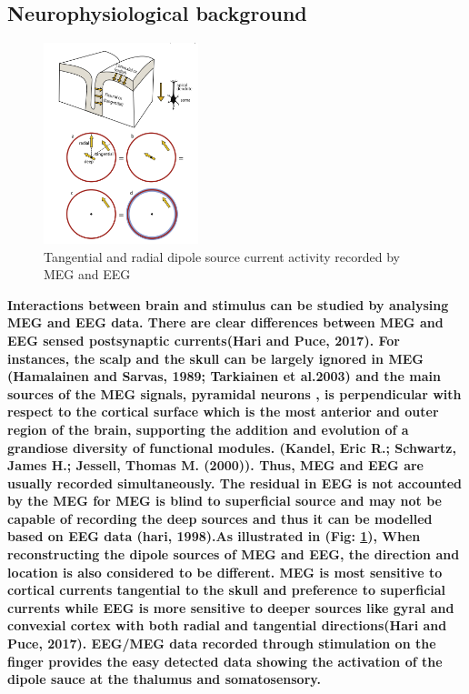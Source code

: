 \documentclass[5p]{elsarticle}
\begin{document}
\begin{frontmatter}
\subsection{Neurophysiological background} 
    \begin{figure}[h!]
        \begin{center}            \includegraphics[width=0.4\textwidth]{figure_1.png}
        \end{center}
        \caption{Tangential and radial dipole source current activity recorded by MEG and EEG\cite{18}
        }
        \label{fig_2}
    \end{figure}

\bf Interactions between brain and stimulus can be studied by analysing MEG and EEG data. There are clear differences between MEG and EEG sensed postsynaptic currents(Hari and Puce, 2017). For instances, the scalp and the skull can be largely ignored  in MEG (Hamalainen and Sarvas, 1989; Tarkiainen et al.2003) and the main sources of the MEG signals, pyramidal neurons , is perpendicular with respect to the cortical surface which is the most anterior and outer region of the brain, supporting the addition and evolution of a grandiose diversity of functional modules. (Kandel, Eric R.; Schwartz, James H.; Jessell, Thomas M. (2000)). Thus, MEG and EEG are usually recorded simultaneously. The residual in EEG is not accounted by the MEG for MEG is blind to superficial source and may not be capable of recording the deep sources and thus it can be modelled based on EEG data (hari, 1998).As illustrated in (Fig: \textcolor{red} {\ref{fig_2}}), When reconstructing the dipole sources of MEG and EEG, the direction and location is also considered to be different. MEG is most sensitive to cortical currents tangential to the skull and preference to superficial currents while EEG is more sensitive to deeper sources like gyral and convexial cortex with both radial and tangential directions(Hari and Puce, 2017). EEG/MEG data recorded through stimulation on the finger provides the easy detected data showing the activation of the dipole sauce at the thalumus\cite{19} and  somatosensory\cite{20}.



\end{frontmatter}
\end{document}
